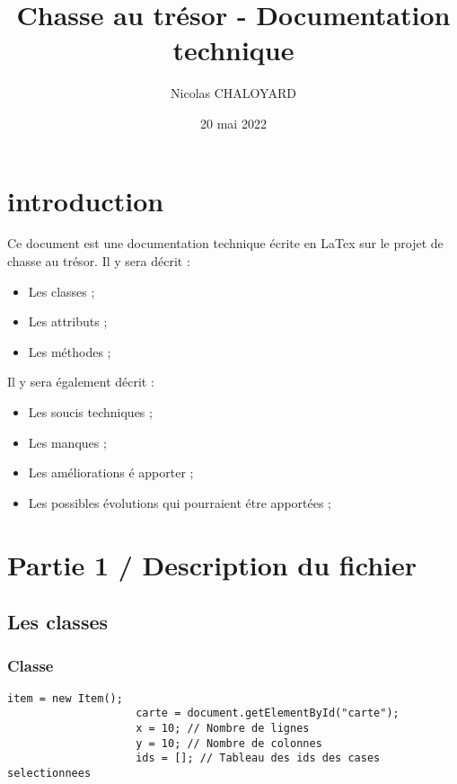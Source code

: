 \documentclass[12pt,a4paper]{article}
\title{Chasse au trésor - Documentation technique}
\author{Nicolas CHALOYARD}
\date{20 mai 2022}
\begin{document}
	\maketitle
	\newpage

	\tableofcontents 
	\newpage

    \section{introduction}
    	Ce document est une documentation technique écrite en LaTex sur le projet de chasse au trésor. \newline
    	Il y sera décrit : 
    	\begin{itemize}
    		\item Les classes ; 
    		\item Les attributs ;
    		\item Les méthodes ;
    	\end{itemize}
    	Il y sera également décrit : 
    	\begin{itemize}
    		\item Les soucis techniques ;
    		\item Les manques ;
    		\item Les améliorations é apporter ;
    		\item Les possibles évolutions qui pourraient étre apportées ; 
    	\end{itemize}
   	\newpage
   	
   	\section{Partie 1 / Description du fichier \color{red}{jeu.js}}
   		\subsection{Les classes}
    	 	\subsubsection{Classe \color{red}{Jeu}}
    	 		\begin{lstlisting}[caption={Attributs classe jeu}]
    	 			item = new Item();
    	 			carte = document.getElementById("carte");
    	 			x = 10; // Nombre de lignes
    	 			y = 10; // Nombre de colonnes
				    ids = []; // Tableau des ids des cases selectionnees
			    \end{lstlisting}
\end{document}
